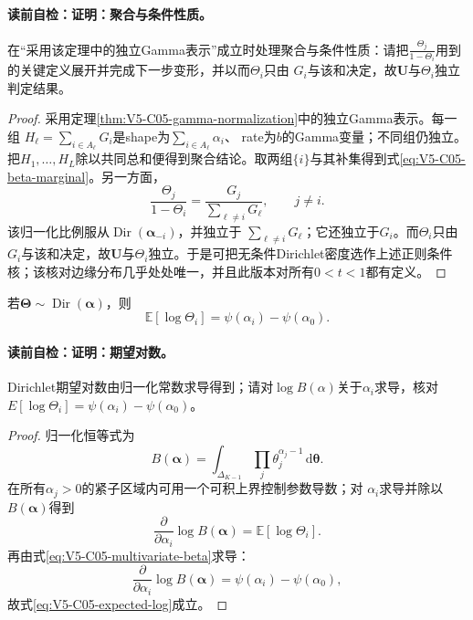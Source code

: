 \paragraph{读前自检：证明：聚合与条件性质。}在“采用该定理中的独立Gamma表示”成立时处理聚合与条件性质：请把$\frac{\Theta_j}{1-\Theta_i}$用到的关键定义展开并完成下一步变形，并以而$\Theta_i$只由 $G_i$与该和决定，故$\boldsymbol U$与$\Theta_i$独立判定结果。\par

\begin{proof}
采用定理\ref{thm:V5-C05-gamma-normalization}中的独立Gamma表示。每一组
$H_\ell=\sum_{i\in A_\ell}G_i$是shape为$\sum_{i\in A_\ell}\alpha_i$、
rate为$b$的Gamma变量；不同组仍独立。把$H_1,\ldots,H_L$除以共同总和便得到聚合结论。取两组$\{i\}$与其补集得到式\eqref{eq:V5-C05-beta-marginal}。另一方面，
\[
\frac{\Theta_j}{1-\Theta_i}
=\frac{G_j}{\sum_{\ell\ne i}G_\ell},\qquad j\ne i.
\]
该归一化比例服从$\operatorname{Dir}(\boldsymbol\alpha_{-i})$，并独立于
$\sum_{\ell\ne i}G_\ell$；它还独立于$G_i$。而$\Theta_i$只由
$G_i$与该和决定，故$\boldsymbol U$与$\Theta_i$独立。于是可把无条件Dirichlet密度选作上述正则条件核；该核对边缘分布几乎处处唯一，并且此版本对所有$0<t<1$都有定义。
\end{proof}

\begin{proposition}[期望对数]\label{prop:V5-C05-expected-log}
若$\boldsymbol\Theta\sim\operatorname{Dir}(\boldsymbol\alpha)$，则
\begin{equation}\label{eq:V5-C05-expected-log}
\mathbb E[\log\Theta_i]
=\psi(\alpha_i)-\psi(\alpha_0).
\end{equation}
\end{proposition}
\paragraph{读前自检：证明：期望对数。}Dirichlet期望对数由归一化常数求导得到；请对$\log B(\alpha)$关于$\alpha_i$求导，核对$E[\log\Theta_i]=\psi(\alpha_i)-\psi(\alpha_0)$。\par

\begin{proof}
归一化恒等式为
\[
B(\boldsymbol\alpha)
=\int_{\Delta_{K-1}}\prod_j\theta_j^{\alpha_j-1}
\,\mathrm d\boldsymbol\theta.
\]
在所有$\alpha_j>0$的紧子区域内可用一个可积上界控制参数导数；对
$\alpha_i$求导并除以$B(\boldsymbol\alpha)$得到
\[
\frac{\partial}{\partial\alpha_i}\log B(\boldsymbol\alpha)
=\mathbb E[\log\Theta_i].
\]
再由式\eqref{eq:V5-C05-multivariate-beta}求导：
\[
\frac{\partial}{\partial\alpha_i}\log B(\boldsymbol\alpha)
=\psi(\alpha_i)-\psi(\alpha_0),
\]
故式\eqref{eq:V5-C05-expected-log}成立。
\end{proof}

